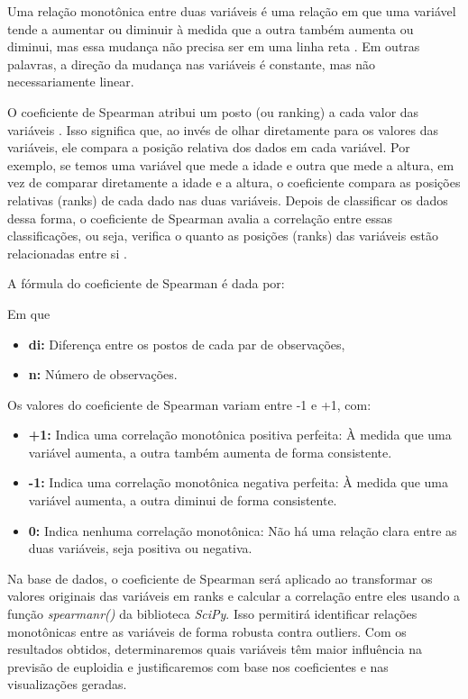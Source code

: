 \begin{apendicesenv}
Uma relação monotônica entre duas variáveis é uma relação em que uma variável tende a aumentar ou diminuir à medida que a outra também aumenta ou diminui, mas essa mudança não precisa ser em uma linha reta \cite{restrepo2007}. Em outras palavras, a direção da mudança nas variáveis é constante, mas não necessariamente linear.

O coeficiente de Spearman atribui um posto (ou ranking) a cada valor das variáveis \cite{sousa2019}. Isso significa que, ao invés de olhar diretamente para os valores das variáveis, ele compara a posição relativa dos dados em cada variável. Por exemplo, se temos uma variável que mede a idade e outra que mede a altura, em vez de comparar diretamente a idade e a altura, o coeficiente compara as posições relativas (ranks) de cada dado nas duas variáveis. Depois de classificar os dados dessa forma, o coeficiente de Spearman avalia a correlação entre essas classificações, ou seja, verifica o quanto as posições (ranks) das variáveis estão relacionadas entre si \cite{sousa2019}.

A fórmula do coeficiente de Spearman é dada por:



%     

Em que
\begin{itemize}
  \item \textbf{di:} Diferença entre os postos de cada par de observações,
  \item \textbf{n:} Número de observações.
\end{itemize}

Os valores do coeficiente de Spearman variam entre -1 e +1, com:
\begin{itemize}
  \item \textbf{+1:} Indica uma correlação monotônica positiva perfeita: À medida que uma variável aumenta, a outra também aumenta de forma consistente.
  \item \textbf{-1:} Indica uma correlação monotônica negativa perfeita: À medida que uma variável aumenta, a outra diminui de forma consistente.
  \item \textbf{0:} Indica nenhuma correlação monotônica: Não há uma relação clara entre as duas variáveis, seja positiva ou negativa.
\end{itemize}

Na base de dados, o coeficiente de Spearman será aplicado ao transformar os valores originais das variáveis em ranks e calcular a correlação entre eles usando a função \textit{spearmanr()} da biblioteca \textit{SciPy}. Isso permitirá identificar relações monotônicas entre as variáveis de forma robusta contra outliers. Com os resultados obtidos, determinaremos quais variáveis têm maior influência na previsão de euploidia e justificaremos com base nos coeficientes e nas visualizações geradas.

\end{apendicesenv}
